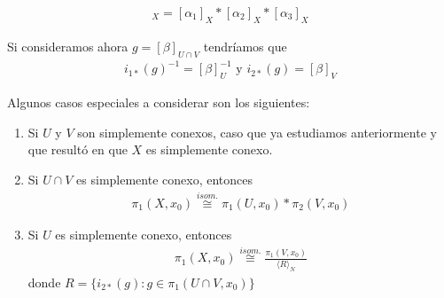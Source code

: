 \begin{gather*}
    [\alpha]_X = [\alpha_1]_X \ast [\alpha_2]_X \ast [\alpha_3]_X
\end{gather*}

Si consideramos ahora $g=[\beta]_{U\cap V}$ tendríamos que 
\begin{gather*}
    i_{1*}(g)^{-1} = [\beta]_U^{-1}\text{ y } i_{2*}(g) = [\beta]_V
\end{gather*}

\begin{observacion}
    Algunos casos especiales a considerar son los siguientes:
    \begin{enumerate}
        \item Si $U$ y $V$ son simplemente conexos, caso que ya estudiamos anteriormente y que resultó en que $X$ es simplemente conexo.

        \item Si $U\cap V$ es simplemente conexo, entonces
        \begin{gather*}
            \pi_1(X,x_0) \overset{isom.}{\cong} \pi_1(U,x_0) \ast \pi_2(V,x_0)
        \end{gather*}

        \item Si $U$ es simplemente conexo, entonces 
        \begin{gather*}
            \pi_1(X,x_0) \overset{isom.}{\cong} \frac{\pi_1(V,x_0)}{\langle R \rangle_N}
        \end{gather*}
        donde $R=\{i_{2*}(g) : g\in \pi_1(U\cap V, x_0)\}$
    \end{enumerate}
\end{observacion}


